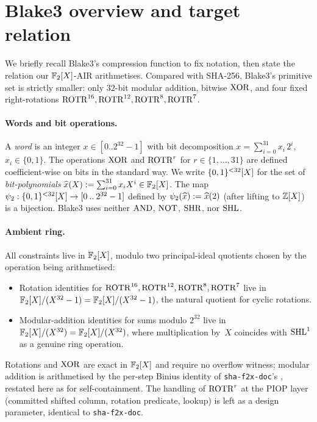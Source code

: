 \section{Blake3 overview and target relation}\label{sec:overview}

We briefly recall Blake3's compression function to fix notation, then
state the relation our $\mathbb{F}_2[X]$-AIR arithmetises. Compared with
SHA-256, Blake3's primitive set is strictly smaller: only
$32$-bit modular addition, bitwise $\operatorname{XOR}$, and four fixed
right-rotations $\operatorname{ROTR}^{16}, \operatorname{ROTR}^{12}, \operatorname{ROTR}^{8}, \operatorname{ROTR}^{7}$.

\paragraph{Words and bit operations.}
A \emph{word} is an integer $x \in [0\mathbin{..}2^{32}-1]$ with bit
decomposition $x = \sum_{i=0}^{31} x_i\, 2^i$, $x_i \in \{0,1\}$. The
operations $\operatorname{XOR}$ and $\operatorname{ROTR}^r$ for $r \in \{1,\dots,31\}$ are defined
coefficient-wise on bits in the standard way. We write $\{0,1\}^{<32}[X]$
for the set of \emph{bit-polynomials}
$\widehat{x}(X) := \sum_{i=0}^{31} x_i X^i \in \mathbb{F}_2[X]$. The map
$\psi_{2}: \{0,1\}^{<32}[X] \to [0\mathbin{..}2^{32}-1]$ defined by
$\psi_{2}(\widehat{x}) := \widehat{x}(2)$ (after lifting to $\mathbb{Z}[X]$) is a
bijection. Blake3 uses neither $\operatorname{AND}$, $\operatorname{NOT}$, $\operatorname{SHR}$, nor $\operatorname{SHL}$.

\paragraph{Ambient ring.}
All constraints live in $\mathbb{F}_2[X]$, modulo two principal-ideal
quotients chosen by the operation being arithmetised:
\begin{itemize}[leftmargin=2em,topsep=2pt]
  \item Rotation identities for $\operatorname{ROTR}^{16}, \operatorname{ROTR}^{12}, \operatorname{ROTR}^{8},
        \operatorname{ROTR}^{7}$ live in $\mathbb{F}_2[X]/(X^{32}-1) = \mathbb{F}_2[X]/(X^{32}-1)$, the natural
        quotient for cyclic rotations.
  \item Modular-addition identities for sums modulo $2^{32}$ live in
        $\mathbb{F}_2[X]/(X^{32}) = \mathbb{F}_2[X]/(X^{32})$, where multiplication by~$X$
        coincides with $\operatorname{SHL}^{1}$ as a genuine ring operation.
\end{itemize}
Rotations and $\operatorname{XOR}$ are exact in $\mathbb{F}_2[X]$ and require no overflow
witness; modular addition is arithmetised by the per-step Binius
identity of \texttt{sha-f2x-doc}'s , restated here
as  for self-containment. The handling of
$\operatorname{ROTR}^r$ at the PIOP layer (committed shifted column, rotation
predicate, lookup) is left as a design parameter, identical to
\texttt{sha-f2x-doc}.

